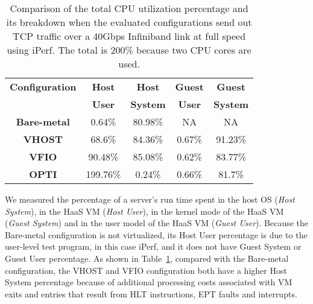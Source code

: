 \begin{table}
\renewcommand{\arraystretch}{1.2}
\small
\begin{center}
\begin{tabular}{|c|c|c|c|c|} \hline
{\bf Configuration} & {\bf Host } & {\bf Host } & {\bf Guest} & {\bf Guest} \\ 
{\bf } & {\bf  User } & {\bf System } & {\bf  User} & {\bf System} \\ \hline
 {\bf Bare-metal}    & 0.64\%   & 80.98\% & NA & NA\\ \hline
 {\bf VHOST} & 68.6\%   & 84.36\% & 0.67\% & 91.23\% \\ \hline
{\bf VFIO}   & 90.48\%  & 85.08\% & 0.62\% & 83.77\% \\ \hline
 {\bf OPTI}  & 199.76\% & 0.24\%  & 0.66\% & 81.7\% \\ \hline 
\end{tabular}
\end{center}
\vspace{-0.1in}
\caption{Comparison of the total CPU utilization percentage and its breakdown 
when the evaluated configurations send out TCP traffic over a
40Gbps Infiniband link at full speed using iPerf. The total is 200\% because two CPU cores are used.}
\label{tab:cpu_utilization_40gbps}
\vspace{-0.1in}
\end{table}

We measured the percentage of a \na server's run time spent in the host OS ({\em Host System}),
in the HaaS VM ({\em Host User}), in the kernel mode of the HaaS VM ({\em Guest System})
and in the user model  of the HaaS VM ({\em Guest User}).
Because  the Bare-metal configuration is not virtualized, its Host User percentage is due to 
the user-level test program, in this case iPerf, and it does not have Guest System or 
Guest User percentage.
As shown in Table~\ref{tab:cpu_utilization_40gbps}, compared with the Bare-metal configuration, 
the VHOST and VFIO configuration both have a higher Host System percentage because of additional 
processing costs associated with VM exits and entries that result from HLT instructions, EPT faults and interrupts.


